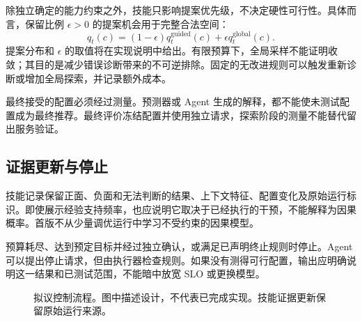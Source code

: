 \documentclass[UTF8,11pt,a4paper,fontset=windows]{ctexart}
\begin{document}
除独立确定的能力约束之外，技能只影响提案优先级，不决定硬性可行性。具体而言，保留比例 $\epsilon>0$ 的提案机会用于完整合法空间：
\begin{equation}
 q_t(c)=(1-\epsilon)q_t^{\mathrm{guided}}(c)
                 +\epsilon q_t^{\mathrm{global}}(c).
\end{equation}
提案分布和 $\epsilon$ 的取值将在实现说明中给出。有限预算下，全局采样不能证明收敛；其目的是减少错误诊断带来的不可逆排除。固定的无改进规则可以触发重新诊断或增加全局探索，并记录额外成本。

最终接受的配置必须经过测量。预测器或 Agent 生成的解释，都不能使未测试配置成为最终推荐。最终评价冻结配置并使用独立请求，探索阶段的测量不能替代留出服务验证。

\subsection{证据更新与停止}
技能记录保留正面、负面和无法判断的结果、上下文特征、配置变化及原始运行标识。即使展示经验支持频率，也应说明它取决于已经执行的干预，不能解释为因果概率。首版不从少量调优运行中学习不受约束的因果模型。

预算耗尽、达到预定目标并经过独立确认，或满足已声明终止规则时停止。Agent 可以提出停止请求，但由执行器检查规则。如果没有测得可行配置，输出应明确说明这一结果和已测试范围，不能暗中放宽 SLO 或更换模型。

\begin{figure}[t]
\centering
{}
\caption{拟议控制流程。图中描述设计，不代表已完成实现。技能证据更新保留原始运行来源。}
\label{fig:architecture}
\end{figure}
\end{document}
